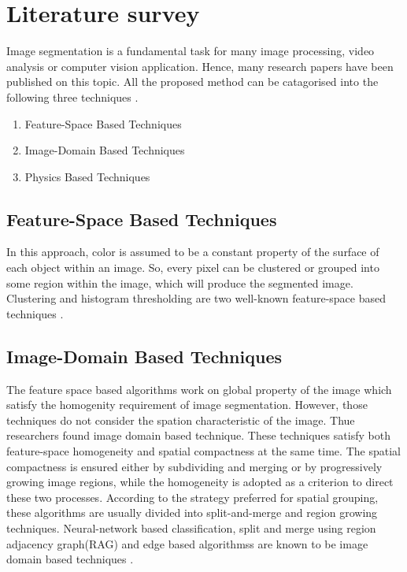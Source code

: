\documentclass[conference]{IEEEtran}
\begin{document}
\section{Literature survey}\label{Literature survey}
Image segmentation is a fundamental task for many image processing, video analysis or computer vision application. Hence, many research papers have been published on this topic. All the proposed method can be catagorised into the following three techniques \cite{lucchese2001colour}.
\begin{enumerate}
	\item Feature-Space Based Techniques
	\item Image-Domain Based Techniques
	\item Physics Based Techniques
\end{enumerate}

\subsection{Feature-Space Based Techniques} 
In this approach, color is assumed to be a constant property of the surface of each object within an image. So, every pixel can be clustered or grouped into some region within the image, which will produce the segmented image. Clustering and histogram thresholding are two well-known feature-space based techniques \cite{lucchese2001colour}.



\subsection{Image-Domain Based Techniques} 
The feature space based algorithms work on global property of the image which satisfy the homogenity requirement of image  segmentation. However, those techniques do not consider the spation characteristic of the image. Thue researchers found image domain based technique. These techniques satisfy both feature-space homogeneity and spatial compactness at the same time. The spatial compactness is ensured either by subdividing and merging or by progressively growing image regions, while the homogeneity is adopted as a criterion to direct these two processes. According to the strategy preferred for spatial grouping, these algorithms are usually divided into split-and-merge and region growing techniques.
Neural-network based classification, split and merge using region adjacency graph(RAG)  and edge based algorithmss are known to be image domain based techniques \cite{lucchese2001colour}.
\end{document}
